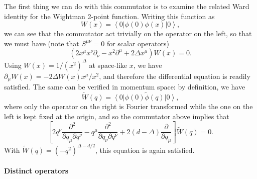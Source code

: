 \documentclass[a4paper,12pt]{article}
\newcommand{\ket}[1]{\left| #1 \right\rangle}
\newcommand{\bra}[1]{\left\langle #1 \right|}
\numberwithin{equation}{section}
\begin{document}
The first thing we can do with this commutator is to examine the related Ward identity for the Wightman 2-point function. Writing this function as
\begin{equation}
	W(x) = \bra{0} \phi(0) \phi(x) \ket{0},
\end{equation}
we can see that the commutator act trivially on the operator on the left, so that we must have (note that $S^{\mu\nu} = 0$ for scalar operators)
\begin{equation}
	\left( 2 x^\mu x^\nu \partial_\nu - x^2 \partial^\mu 
	+ 2 \Delta x^\mu \right) W(x) = 0.
\end{equation}
Using $W(x) = 1 /(x^2)^{\Delta}$ at space-like $x$, we have $\partial_\mu W(x) = - 2 \Delta W(x) x^\mu / x^2$, and therefore the differential equation is readily satisfied.
The same can be verified in momentum space: by definition, we have
\begin{equation}
	\widetilde{W}(q) = \bra{0} \phi(0) \widetilde{\phi}(q) \ket{0},
\end{equation}
where only the operator on the right is Fourier transformed while the one on the left is kept fixed at the origin, and so the commutator above implies that
\begin{equation}
	\left[ 2 q^\nu \frac{\partial^2}{\partial q_\mu \partial q^\nu} 
	- q^\mu \frac{\partial^2}{\partial q_\nu \partial q^\nu}
	+ 2 (d - \Delta) \frac{\partial}{\partial q_\mu} \right]
	\widetilde{W}(q) = 0.
\end{equation}
With $\widetilde{W}(q) = (-q^2)^{\Delta - d/2}$, this equation is again satisfied.

\paragraph{Distinct operators}
\end{document}
